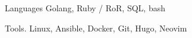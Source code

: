 

\begin{cvskills}

	\cvskill
	{Languages} %
	{Golang, Ruby / RoR, SQL, bash} %

	\cvskill
	{Tools\hphantom{25}\color{white}.\hphantom{25}} %
	{Linux, Ansible, Docker, Git, Hugo, Neovim} %

\end{cvskills}
